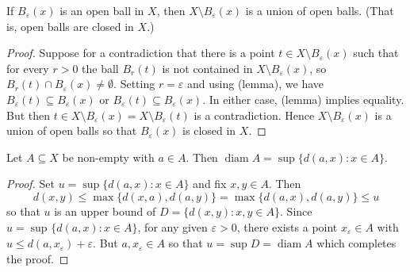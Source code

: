 \begin{lemma}
If \( B_{\varepsilon } (x) \) is an open ball in \( X \), then \( X \setminus  B_{\varepsilon } (x) \) is a union of open balls. (That is, open balls are closed in \( X \).)
\end{lemma}
\begin{proof}
Suppose for a contradiction that there is a point \( t \in X \setminus B_{\varepsilon} (x) \) such that for every \( r > 0 \) the ball \( B_{r}(t) \) is not contained in \( X \setminus B_{\varepsilon } (x) \), so \( B_{r} (t) \cap B_{\varepsilon} (x) \neq \emptyset \). Setting \( r = \varepsilon  \) and using (lemma), we have \( B_{\varepsilon} (t) \subseteq B_{\varepsilon } (x) \) or \( B_{\varepsilon} (t) \subseteq B_{\varepsilon} (x) \). In either case, (lemma) implies equality. But then \( t \in X \setminus B_{\varepsilon } (x) = X \setminus B_{\varepsilon } (t) \) is a contradiction. Hence \( X \setminus B_{\varepsilon } (x) \) is a union of open balls so that \( B_{\varepsilon } (x) \) is closed in \( X \).
\end{proof}
\begin{lemma}
Let \( A \subseteq X \) be non-empty with \( a \in A \). Then \( \operatorname{diam} A = \sup \{ d(a, x) : x \in A \}   \).
\end{lemma}
\begin{proof}
	Set \( u = \sup \{ d(a,x) : x \in A \}  \) and fix \( x,y \in A \). Then \[ d(x,y) \leq \max \{ d(x, a) , d(a, y) \} = \max \{ d(a,x), d(a,y) \} \leq u  \] so that \( u \) is an upper bound of \( D = \{ d(x,y) : x,y \in A \}  \). Since \( u = \sup_{} \{ d(a,x) : x \in A \}  \), for any given \( \varepsilon > 0 \), there exists a point \( x_{\varepsilon } \in A \) with \( u \leq d(a, x_{\varepsilon }) + \varepsilon   \). But \( a, x_{\varepsilon } \in A \) so that \( u = \sup D = \operatorname{diam} A \) which completes the proof.
\end{proof}
